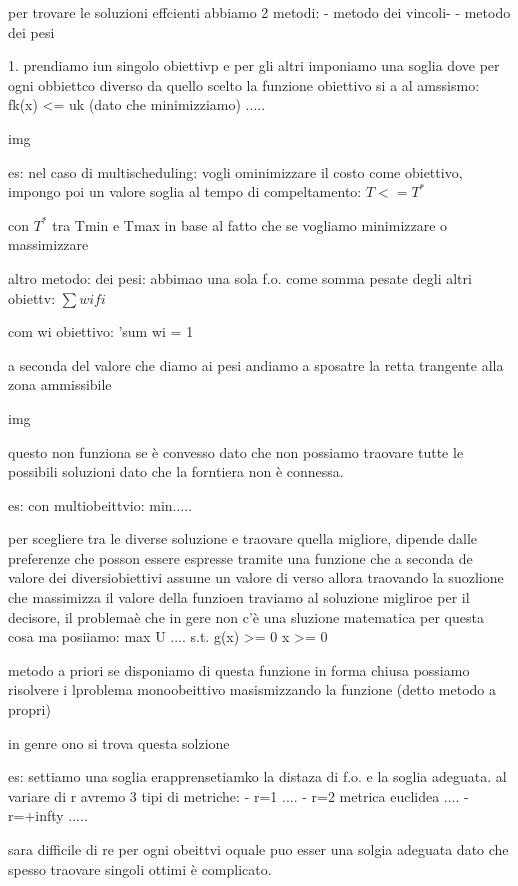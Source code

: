 per trovare le soluzioni effcienti abbiamo 2 metodi:
- metodo dei vincoli-
- metodo dei pesi


1. prendiamo iun singolo obiettivp e per gli altri imponiamo una soglia dove per ogni obbiettco diverso da quello scelto la funzione obiettivo si a al amssismo:
fk(x) <= uk (dato che minimizziamo)
.....

img


es: nel caso di multischeduling:
vogli ominimizzare il costo come obiettivo, impongo poi un valore soglia al tempo di compeltamento:
$T <= T^*$

con $T^*$ tra Tmin e Tmax in base al fatto che se vogliamo minimizzare o massimizzare



altro metodo: dei pesi:
abbimao una sola f.o. come somma pesate degli altri obiettv:
$\sum wi fi$

com wi obiettivo: 'sum wi = 1

a seconda del valore che diamo ai pesi andiamo a sposatre la retta trangente alla zona ammissibile

img

questo non funziona se è convesso dato che non possiamo traovare tutte le possibili soluzioni dato che la forntiera non è connessa. 

es: con multiobeittvio:
min.....





per scegliere tra le diverse soluzione e traovare quella migliore, dipende dalle preferenze che posson essere espresse tramite una funzione che a seconda de valore dei diversiobiettivi assume un valore di verso allora traovando la suozlione che massimizza il valore della funzioen traviamo al soluzione migliroe per il decisore, il problemaè che in gere non c'è una sluzione matematica per questa cosa ma  posiiamo:
max U ....
s.t.
g(x) >= 0
x >= 0

metodo a priori
se disponiamo di questa funzione in forma chiusa possiamo risolvere i lproblema monoobeittivo masismizzando la funzione (detto metodo a propri)

in genre ono si trova questa solzione

es: settiamo una soglia erapprensetiamko la distaza di f.o. e la soglia adeguata. al variare di r avremo  3 tipi di metriche:
- r=1 ....
- r=2 metrica euclidea ....
- r=+infty .....

sara difficile di re per ogni obeittvi oquale puo esser una solgia adeguata dato che spesso traovare singoli ottimi è complicato.




